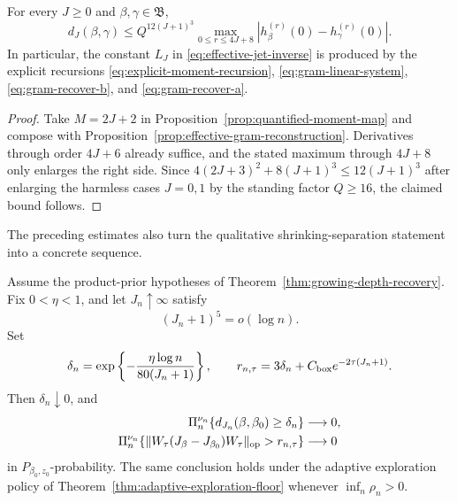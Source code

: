 \begin{theorem}
\label{thm:effective-response-jet-audit}
For every \(J\ge0\) and \(\beta,\gamma\in\mathfrak B\),
\begin{equation}
 d_J(\beta,\gamma)
 \le Q^{12(J+1)^3}
 \max_{0\le r\le4J+8}
 |h_\beta^{(r)}(0)-h_\gamma^{(r)}(0)|.
 \label{eq:audited-effective-jet-inverse}
\end{equation}
In particular, the constant \(L_J\) in
\eqref{eq:effective-jet-inverse} is produced by the explicit recursions
\eqref{eq:explicit-moment-recursion},
\eqref{eq:gram-linear-system},
\eqref{eq:gram-recover-b}, and \eqref{eq:gram-recover-a}.
\end{theorem}

\begin{proof}
Take \(M=2J+2\) in Proposition~\ref{prop:quantified-moment-map} and compose
with Proposition~\ref{prop:effective-gram-reconstruction}.  Derivatives
through order \(4J+6\) already suffice, and the stated maximum through
\(4J+8\) only enlarges the right side.  Since
\(4(2J+3)^2+8(J+1)^3\le12(J+1)^3\) after enlarging the harmless cases
\(J=0,1\) by the standing factor \(Q\ge16\), the claimed bound follows.
\end{proof}

The preceding estimates also turn the qualitative shrinking-separation
statement into a concrete sequence.

\begin{theorem}
\label{thm:explicit-shrinking-block-rate}
Assume the product-prior hypotheses of
Theorem~\ref{thm:growing-depth-recovery}.  Fix \(0<\eta<1\), and let
\(J_n\uparrow\infty\) satisfy
\begin{equation}
 (J_n+1)^5=o(\log n).
 \label{eq:explicit-depth-regime}
\end{equation}
Set
\begin{equation}
 \delta_n=\exp\left\{-\frac{\eta\log n}{80(J_n+1)}\right\},
 \qquad
 r_{n,\tau}=3\delta_n+C_{\rm box}e^{-2\tau(J_n+1)}.
 \label{eq:explicit-shrinking-radius}
\end{equation}
Then \(\delta_n\downarrow0\), and
\begin{align}
 \Pi_n^{\nu_n}\{d_{J_n}(\beta,\beta_0)\ge\delta_n\}
 &\longrightarrow0,
 \label{eq:explicit-block-contraction}\\
 \Pi_n^{\nu_n}\{\|W_\tau(J_\beta-J_{\beta_0})W_\tau\|_{\rm op}
                 >r_{n,\tau}\}
 &\longrightarrow0
 \label{eq:explicit-weighted-contraction}
\end{align}
in \(P_{\beta_0,z_0}\)-probability.  The same conclusion holds under the
adaptive exploration policy of
Theorem~\ref{thm:adaptive-exploration-floor} whenever
\(\inf_n\rho_n>0\).
\end{theorem}


